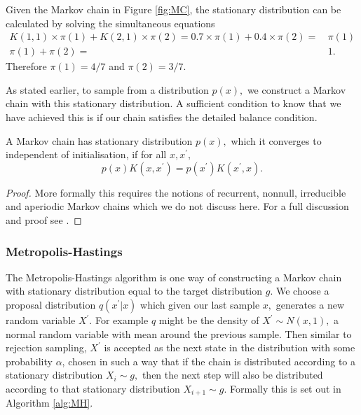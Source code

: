 \begin{example}
    Given the Markov chain in Figure \ref{fig:MC}, the stationary distribution
    can be calculated by solving the simultaneous equations
    \begin{align*}
        K(1, 1) \times \pi(1)
        + K(2, 1) \times \pi(2) = 0.7 \times \pi(1)
        + 0.4 \times \pi(2) = & \, \pi(1) \\
        \pi(1) + \pi(2) =     & \, 1.
    \end{align*}
    Therefore $\pi(1) = 4/7$ and $\pi(2) = 3/7.$
\end{example}

As stated earlier, to sample from a distribution $p(x),$ we construct a Markov
chain with this stationary distribution. A sufficient condition to know that
we have achieved this is if our chain satisfies the detailed balance
condition.

\begin{theorem}
    A Markov chain has stationary distribution $p(x),$ which it converges to
    independent of initialisation, if for all $x, x^\prime,$
    $$p(x)K(x, x^\prime) = p(x^\prime)K(x^\prime, x).$$
\end{theorem}

\begin{proof}
    More formally this requires the notions of recurrent, nonnull,
    irreducible and aperiodic Markov chains which we do not discuss here. 
    For a full
    discussion and proof
    see \cite[Chapter 6]{robert_monte_2010}.
\end{proof}

\subsubsection*{Metropolis-Hastings}

The Metropolis-Hastings algorithm is one way of constructing a Markov
chain with stationary distribution equal to the target distribution $g.$
We choose a proposal distribution $q(x^\prime| x)$ which given our last sample
$x,$ generates a new random
variable $X^\prime.$ For example $q$ might be the density of
$X^\prime \sim N(x, 1),$ a normal random variable with mean
around the previous sample. Then similar to rejection sampling, $X^\prime$
is accepted as the next state in the distribution with some probability
$\alpha$, chosen in such a way that if the chain is distributed according to
a stationary distribution
$X_i \sim g,$ then the next step will also be distributed according to that
stationary distribution $X_{i + 1}\sim g.$ Formally this is set out in
Algorithm \ref{alg:MH}.

